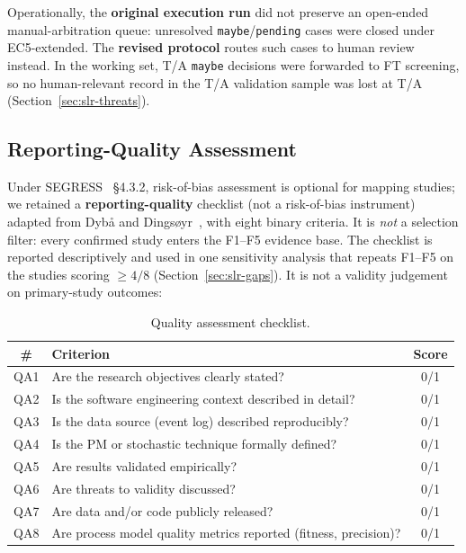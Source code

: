Operationally, the \textbf{original execution run} did not preserve an
open-ended manual-arbitration queue: unresolved \texttt{maybe}/\texttt{pending}
cases were closed under EC5-extended. The \textbf{revised protocol} routes
such cases to human review instead. In the working set, T/A \texttt{maybe}
decisions were forwarded to FT screening, so no human-relevant record in the
T/A validation sample was lost at T/A (Section~\ref{sec:slr-threats}).


\subsection{Reporting-Quality Assessment}
\label{sec:slr-qa}

Under SEGRESS~\cite{kitchenham2023segress} \S4.3.2, risk-of-bias assessment
is optional for mapping studies; we retained a \textbf{reporting-quality}
checklist (not a risk-of-bias instrument) adapted from
Dyb{\aa} and Dings{\o}yr~\cite{dyba2008}, with eight binary criteria. It is
\emph{not} a selection filter: every confirmed study enters the F1--F5
evidence base. The checklist is reported descriptively and used in one
sensitivity analysis that repeats F1--F5 on the studies scoring $\geq 4/8$
(Section~\ref{sec:slr-gaps}). It is not a validity judgement on primary-study
outcomes:

\begin{table}[htbp]
\centering
\caption{Quality assessment checklist.}
\label{tab:qa}
\begin{tabular}{clc}
\toprule
\textbf{\#} & \textbf{Criterion} & \textbf{Score} \\
\midrule
QA1 & Are the research objectives clearly stated?                    & 0/1 \\
QA2 & Is the software engineering context described in detail?       & 0/1 \\
QA3 & Is the data source (event log) described reproducibly?         & 0/1 \\
QA4 & Is the PM or stochastic technique formally defined?            & 0/1 \\
QA5 & Are results validated empirically?                             & 0/1 \\
QA6 & Are threats to validity discussed?                             & 0/1 \\
QA7 & Are data and/or code publicly released?                              & 0/1 \\
QA8 & Are process model quality metrics reported (fitness, precision)?& 0/1 \\
\bottomrule
\end{tabular}
\end{table}

